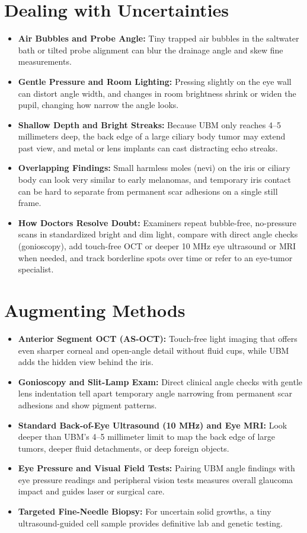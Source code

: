 \section{Dealing with Uncertainties}

\begin{itemize}
    \item \textbf{Air Bubbles and Probe Angle:} Tiny trapped air bubbles in the saltwater bath or tilted probe alignment can blur the drainage angle and skew fine measurements.
    \item \textbf{Gentle Pressure and Room Lighting:} Pressing slightly on the eye wall can distort angle width, and changes in room brightness shrink or widen the pupil, changing how narrow the angle looks.
    \item \textbf{Shallow Depth and Bright Streaks:} Because UBM only reaches 4--5 millimeters deep, the back edge of a large ciliary body tumor may extend past view, and metal or lens implants can cast distracting echo streaks.
    \item \textbf{Overlapping Findings:} Small harmless moles (nevi) on the iris or ciliary body can look very similar to early melanomas, and temporary iris contact can be hard to separate from permanent scar adhesions on a single still frame.
    \item \textbf{How Doctors Resolve Doubt:} Examiners repeat bubble-free, no-pressure scans in standardized bright and dim light, compare with direct angle checks (gonioscopy), add touch-free OCT or deeper 10 MHz eye ultrasound or MRI when needed, and track borderline spots over time or refer to an eye-tumor specialist.
\end{itemize}

\section{Augmenting Methods}

\begin{itemize}
    \item \textbf{Anterior Segment OCT (AS-OCT):} Touch-free light imaging that offers even sharper corneal and open-angle detail without fluid cups, while UBM adds the hidden view behind the iris.
    \item \textbf{Gonioscopy and Slit-Lamp Exam:} Direct clinical angle checks with gentle lens indentation tell apart temporary angle narrowing from permanent scar adhesions and show pigment patterns.
    \item \textbf{Standard Back-of-Eye Ultrasound (10 MHz) and Eye MRI:} Look deeper than UBM's 4--5 millimeter limit to map the back edge of large tumors, deeper fluid detachments, or deep foreign objects.
    \item \textbf{Eye Pressure and Visual Field Tests:} Pairing UBM angle findings with eye pressure readings and peripheral vision tests measures overall glaucoma impact and guides laser or surgical care.
    \item \textbf{Targeted Fine-Needle Biopsy:} For uncertain solid growths, a tiny ultrasound-guided cell sample provides definitive lab and genetic testing.
\end{itemize}

